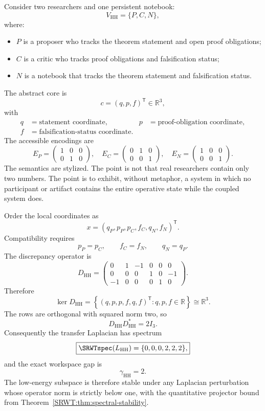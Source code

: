 Consider two researchers and one persistent notebook:
\[
V_{\mathrm{HH}}=\{P,C,N\},
\]
where:
\begin{itemize}
\item \(P\) is a proposer who tracks the theorem statement and open proof
 obligations;
\item \(C\) is a critic who tracks proof obligations and falsification status;
\item \(N\) is a notebook that tracks the theorem statement and falsification
 status.
\end{itemize}
The abstract core is
\[
c=(q,p,f)^{\mathsf T}\in\mathbb R^3,
\]
with
\[
\begin{aligned}
q&=\text{statement coordinate},
&
p&=\text{proof-obligation coordinate},\\
f&=\text{falsification-status coordinate}.
\end{aligned}
\]
The accessible encodings are
\[
E_P=
\begin{pmatrix}
1&0&0\\
0&1&0
\end{pmatrix},
\quad
E_C=
\begin{pmatrix}
0&1&0\\
0&0&1
\end{pmatrix},
\quad
E_N=
\begin{pmatrix}
1&0&0\\
0&0&1
\end{pmatrix}.
\]
The semantics are stylized. The point is not that real researchers contain
only two numbers. The point is to exhibit, without metaphor, a system in which
no participant or artifact contains the entire operative state while the
coupled system does.


Order the local coordinates as
\[
x=(q_P,p_P,p_C,f_C,q_N,f_N)^{\mathsf T}.
\]
Compatibility requires
\[
p_P=p_C,
\qquad
f_C=f_N,
\qquad
q_N=q_P.
\]
The discrepancy operator is
\[
D_{\mathrm{HH}}
=
\begin{pmatrix}
0&1&-1&0&0&0\\
0&0&0&1&0&-1\\
-1&0&0&0&1&0
\end{pmatrix}.
\]
Therefore
\[
\ker D_{\mathrm{HH}}
=
\left\{
(q,p,p,f,q,f)^{\mathsf T}:q,p,f\in\mathbb R
\right\}
\cong\mathbb R^3.
\]
The rows are orthogonal with squared norm two, so
\[
D_{\mathrm{HH}}D_{\mathrm{HH}}^*=2I_3.
\]
Consequently the transfer Laplacian has spectrum
\[
\boxed{
\SRWTspec(L_{\mathrm{HH}})
=
\{0,0,0,2,2,2\},
}
\]
and the exact workspace gap is
\[
\gamma_{\mathrm{HH}}=2.
\]
The low-energy subspace is therefore stable under any Laplacian perturbation
whose operator norm is strictly below one, with the quantitative projector
bound from Theorem~\ref{SRWT:thm:spectral-stability}.

